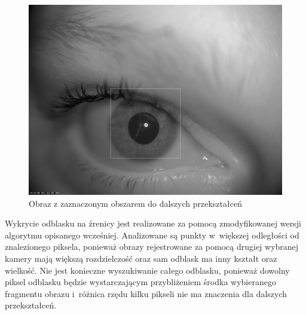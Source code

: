 \begin{figure}
\begin{center}
\includegraphics[scale=0.25]{obszar.jpg}
\caption{Obraz z zaznaczonym obszarem do dalszych przekształceń}
\label{fig:obszar}
\end{center}
\end{figure}

Wykrycie odblasku na źrenicy jest realizowane za pomocą zmodyfikowanej wersji algorytmu opisanego wcześniej. Analizowane są punkty w~większej odległości od znalezionego piksela, ponieważ obrazy rejestrowane za pomocą drugiej wybranej kamery mają większą rozdzielczość oraz sam odblask ma inny kształt oraz wielkość. Nie jest konieczne wyszukiwanie całego odblasku, ponieważ dowolny piksel odblasku będzie wystarczającym przybliżeniem środka wybieranego fragmentu obrazu i~różnica rzędu kilku pikseli nie ma znaczenia dla dalszych przekształceń.

